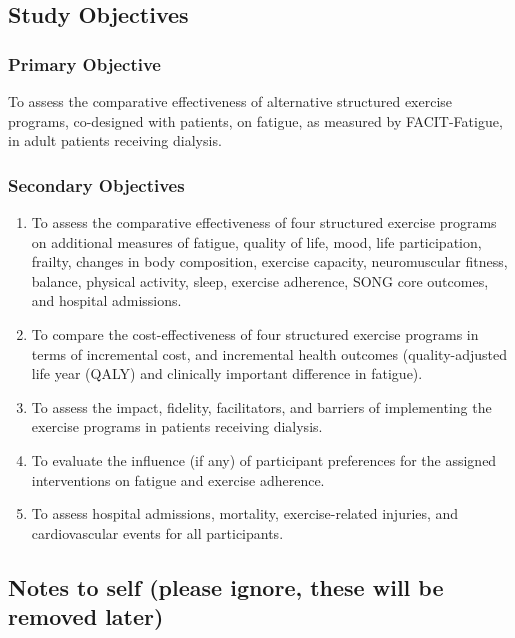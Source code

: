 \documentclass[
]{article}
\begin{document}
\clearpage

\hypertarget{background}{%
  \subsection{Study Objectives}\label{objectives}}


\hypertarget{primary-objective}{
  \subsubsection{Primary Objective}{\label{primary-objective}}
}

To assess the comparative effectiveness of alternative structured exercise programs, co-designed with patients, on fatigue, as measured by FACIT-Fatigue, in adult patients receiving dialysis.

\hypertarget{secondary-objectives}{
  \subsubsection{Secondary Objectives}{\label{secondary-objectives}}
}

\begin{enumerate}
  \def\labelenumi{\arabic{enumi}.}
  \item To assess the comparative effectiveness of four structured exercise programs on additional measures of fatigue, quality of life, mood, life participation, frailty, changes in body composition, exercise capacity, neuromuscular fitness, balance, physical activity, sleep, exercise adherence, SONG core outcomes, and hospital admissions.
  \item To compare the cost-effectiveness of four structured exercise programs in terms of incremental cost, and incremental health outcomes (quality-adjusted life year (QALY) and clinically important difference in fatigue).
  \item To assess the impact, fidelity, facilitators, and barriers of implementing the exercise programs in patients receiving dialysis.
  \item To evaluate the influence (if any) of participant preferences for the assigned interventions on fatigue and exercise adherence.
  \item To assess hospital admissions, mortality, exercise-related injuries, and cardiovascular events for all participants.
\end{enumerate}


\clearpage

\hypertarget{to-be-discussed}{%
  \subsection{Notes to self (please ignore, these will be removed later)}\label{to-be-discussed}}
\end{document}
